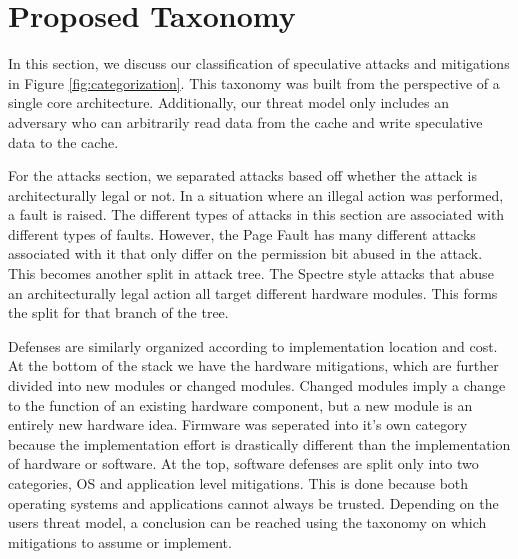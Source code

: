\section{Proposed Taxonomy} \label{Proposed Taxonomy}

In this section, we discuss our classification of speculative attacks and mitigations in Figure \ref{fig:categorization}.
This taxonomy was built from the perspective of a single core architecture.
Additionally, our threat model only includes an adversary who can arbitrarily read data from the cache and write speculative data to the cache.

For the attacks section, we separated attacks based off whether the attack is architecturally legal or not.
In a situation where an illegal action was performed, a fault is raised.
The different types of attacks in this section are associated with different types of faults.
However, the Page Fault has many different attacks associated with it that only differ on the permission bit abused in the attack.
This becomes another split in attack tree.
The Spectre style attacks that abuse an architecturally legal action all target different hardware modules.
This forms the split for that branch of the tree.

Defenses are similarly organized according to implementation location and cost.
At the bottom of the stack we have the hardware mitigations, which are further divided into new modules or changed modules.
Changed modules imply a change to the function of an existing hardware component, but a new module is an entirely new hardware idea.
Firmware was seperated into it's own category because the implementation effort is drastically different than the implementation of hardware or software.
At the top, software defenses are split only into two categories, OS and application level mitigations.
This is done because both operating systems and applications cannot always be trusted.
Depending on the users threat model, a conclusion can be reached using the taxonomy on which mitigations to assume or implement.

